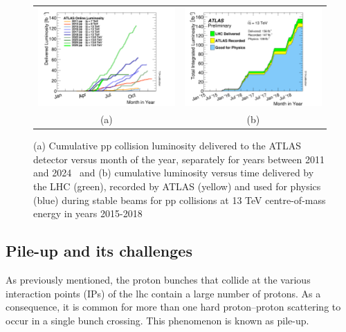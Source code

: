 \begin{figure}[htbp]
\centering
\begin{tabular}{cc}
    \includegraphics[width=0.5\linewidth]{images/intlumivsyear.png} &
    \includegraphics[width=0.5\linewidth]{images/intlumivstimeRun2DQall.png} \\
    (a) & (b)  \\
\end{tabular}
\caption{(a) Cumulative pp collision luminosity delivered to the ATLAS detector versus month
of the year, separately for years between 2011 and 2024~\cite{atlas:Run3lumi} and (b) cumulative luminosity versus
time delivered by the LHC (green), recorded by ATLAS (yellow) and used for physics (blue)
during stable beams for pp collisions at 13 TeV centre-of-mass energy in years 2015-2018~\cite{atlas:Run2lumi}}
\label{figure:Run3lumi}
\end{figure}

\subsection*{Pile-up and its challenges}

As previously mentioned, the proton bunches that collide at the various interaction points (IPs) of the \acrshort{lhc} contain a large number of protons. As a consequence, it is common for more than one hard proton--proton scattering to occur in a single bunch crossing. This phenomenon is known as pile-up.

